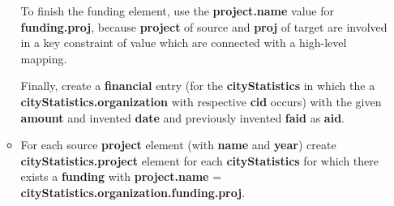 \documentclass{scrartcl}
\begin{document}
\begin{enumerate}
\begin{itemize}
			To finish the funding element, use the \textbf{project.name} value for \textbf{funding.proj}, because \textbf{project} of source and \textbf{proj} of target are involved in a key constraint of value which are connected with a high-level mapping.
			
			Finally, create a \textbf{financial} entry (for the \textbf{cityStatistics} in which the a \textbf{cityStatistics.organization} with respective \textbf{cid} occurs) with the given \textbf{amount} and invented \textbf{date} and previously invented \textbf{faid} as \textbf{aid}.
			
			\item For each source \textbf{project} element (with \textbf{name} and \textbf{year}) create \textbf{cityStatistics.project} element for each \textbf{cityStatistics} for which there exists a \textbf{funding} with \textbf{project.name} = \textbf{cityStatistics.organization.funding.proj}.
		\end{itemize}
		

\end{enumerate}
\end{document}
